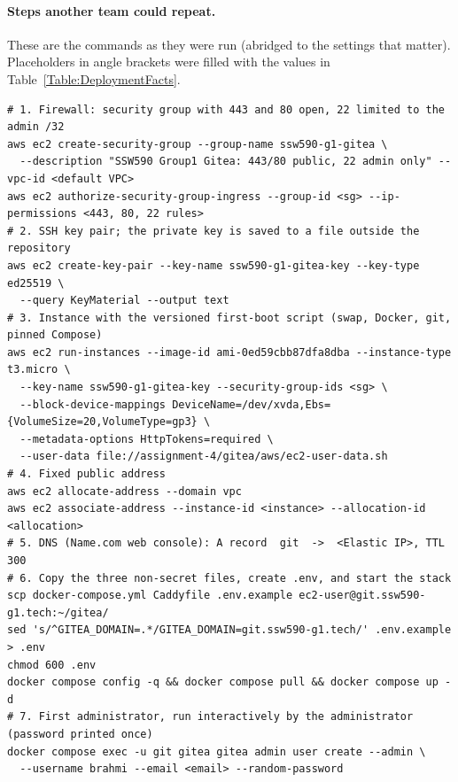 \inputminted{yaml}{config/gitea/docker-compose.yml}

\inputminted{text}{config/gitea/Caddyfile}

\paragraph{Steps another team could repeat.}
These are the commands as they were run (abridged to the settings that matter).
Placeholders in angle brackets were filled with the values in
Table~\ref{Table:DeploymentFacts}.

\begin{verbatim}
# 1. Firewall: security group with 443 and 80 open, 22 limited to the admin /32
aws ec2 create-security-group --group-name ssw590-g1-gitea \
  --description "SSW590 Group1 Gitea: 443/80 public, 22 admin only" --vpc-id <default VPC>
aws ec2 authorize-security-group-ingress --group-id <sg> --ip-permissions <443, 80, 22 rules>
# 2. SSH key pair; the private key is saved to a file outside the repository
aws ec2 create-key-pair --key-name ssw590-g1-gitea-key --key-type ed25519 \
  --query KeyMaterial --output text
# 3. Instance with the versioned first-boot script (swap, Docker, git, pinned Compose)
aws ec2 run-instances --image-id ami-0ed59cbb87dfa8dba --instance-type t3.micro \
  --key-name ssw590-g1-gitea-key --security-group-ids <sg> \
  --block-device-mappings DeviceName=/dev/xvda,Ebs={VolumeSize=20,VolumeType=gp3} \
  --metadata-options HttpTokens=required \
  --user-data file://assignment-4/gitea/aws/ec2-user-data.sh
# 4. Fixed public address
aws ec2 allocate-address --domain vpc
aws ec2 associate-address --instance-id <instance> --allocation-id <allocation>
# 5. DNS (Name.com web console): A record  git  ->  <Elastic IP>, TTL 300
# 6. Copy the three non-secret files, create .env, and start the stack
scp docker-compose.yml Caddyfile .env.example ec2-user@git.ssw590-g1.tech:~/gitea/
sed 's/^GITEA_DOMAIN=.*/GITEA_DOMAIN=git.ssw590-g1.tech/' .env.example > .env
chmod 600 .env
docker compose config -q && docker compose pull && docker compose up -d
# 7. First administrator, run interactively by the administrator (password printed once)
docker compose exec -u git gitea gitea admin user create --admin \
  --username brahmi --email <email> --random-password
\end{verbatim}

